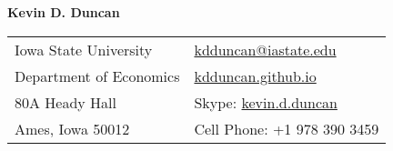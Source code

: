 \documentclass[letterpaper,11pt,oneside]{article}
\newcommand*{\Skype}{\href{skype:kevin.d.duncan}{kevin.d.duncan}}
\newcommand{\Absender}[1][\normalsize]{\Skype}
\begin{document}

\noindent  \LARGE{\textbf{Kevin D. Duncan}}  \\
\vspace{-2ex}
\hline 
\normalsize


\begin{center}
\begin{tabular}{l l}
 Iowa State University    & \hspace{1in} \href{mailto:kdduncan@iastate.edu}{kdduncan@iastate.edu} \\
 Department of Economics    & \hspace{1in}  \href{kdduncan.github.io}{kdduncan.github.io}   \\
 80A Heady Hall             & \hspace{1in} Skype: \Absender  \\
 Ames, Iowa 50012 & \hspace{1in} Cell Phone: +1 978 390 3459 \\
\end{tabular}
\end{center}

\vspace{1em}

\end{document}

